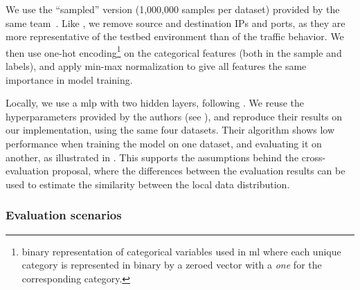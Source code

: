 We use the ``sampled'' version (1,000,000 samples per dataset) provided by the same team~\cite{layeghy_generalisability_2022}. 
Like \citet{de_carvalho_bertoli_generalizing_2023}, we remove source and destination IPs and ports, as they are more representative of the testbed environment than of the traffic behavior.
We then use one-hot encoding\footnote{binary representation of categorical variables used in \gls{ml} where each unique category is represented in binary by a zeroed vector with a \emph{one} for the corresponding category.} on the categorical features (both in the sample and labels), and apply min-max normalization to give all features the same importance in model training.

Locally, we use a \gls{mlp} with two hidden layers, following \citet{popoola_federated_2021}.
We reuse the hyperparameters provided by the authors (see ), and reproduce their results on our implementation, using the same four datasets.
Their algorithm shows low performance when training the model on one dataset, and evaluating it on another, as illustrated in .
This supports the assumptions behind the cross-evaluation proposal, where the differences between the evaluation results can be used to estimate the similarity between the local data distribution.



\subsubsection{Evaluation scenarios\label{sec:eval.methodo.scenarios}}


